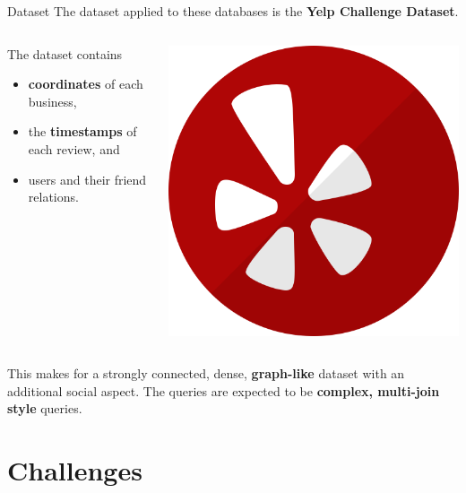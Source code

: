 \begin{frame}{Dataset}
    The dataset applied to these databases is the \textbf{Yelp Challenge Dataset}.
    \vfill
    \begin{columns}
        \begin{column}{.6\textwidth}
        The dataset contains
            \begin{itemize}
                \item \textbf{coordinates} of each business,
                \item the \textbf{timestamps} of each review, and
                \item users and their friend relations.
            \end{itemize}
            \end{column}%
            \hfill%
            \begin{column}{.39\textwidth}
            \centering
            \includegraphics[width=0.7\columnwidth]{img/yelp-logo.png}
        \end{column}%
    \end{columns}
    \vfill
    This makes for a strongly connected, dense, \textbf{graph-like} dataset with an additional social aspect. The queries are expected to be \textbf{complex, multi-join style} queries.
    \vfill
    \parnotes
\end{frame}

\section{Challenges}

